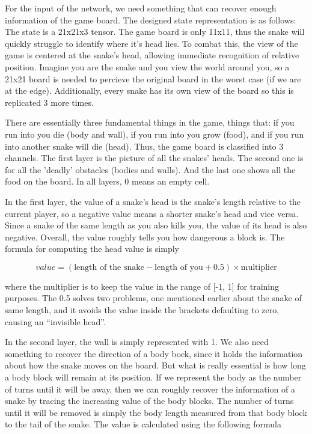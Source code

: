 \documentclass{article}
\begin{document}
\FloatBarrier

For the input of the network, we need something that can recover enough
information of the game board. The designed state representation is as
follows: The state is a 21x21x3 tensor. The game board is only 11x11, thus the
snake will quickly struggle to identify where it's head lies. To combat this,
the view of the game is centered at the snake’s head, allowing immediate
recognition of relative position. Imagine you are the snake and you view the
world around you, so a 21x21 board is needed to percieve the original board in
the worst case (if we are at the edge). Additionally, every snake has
its own view of the board so this is replicated 3 more times.

There are essentially three fundamental things in the game, things that: if you
run into you die (body and wall), if you run into you grow (food),
and if you run into another snake will die (head). Thus, the game board
is classified into 3 channels. The first layer is the picture of all the snakes’
heads. The second one is for all the 'deadly' obstacles (bodies and walls). And
the last one shows all the food on the board. In all layers, 0 means an empty cell.

In the first layer, the value of a snake’s head is the snake’s length relative
to the current player, so a negative value means a shorter snake’s head and vice
versa. Since a snake of the same length as you also kills you, the value of its
head is also negative. Overall, the value roughly tells you how dangerous a
block is. The formula for computing the head value is simply

\begin{equation}
  value = (\text{length of the snake}-\text{length of you}+0.5) \times \text{multiplier}
\end{equation}

where the multiplier is to keep the value in the range of [-1, 1] for training
purposes. The 0.5 solves two problems, one mentioned earlier about the snake of
same length, and it avoids the value inside the brackets defaulting to zero, causing an
“invisible head”.

In the second layer, the wall is simply represented with 1. We also need
something to recover the direction of a body bock, since it holds the
information about how the snake moves on the board. But what is really essential
is how long a body block will remain at its position. If we represent the body
as the number of turns until it will be away, then we can roughly recover the
information of a snake by tracing the increasing value of the body blocks. The
number of turns until it will be removed is simply the body length measured from
that body block to the tail of the snake. The value is calculated using the
following formula
\end{document}
